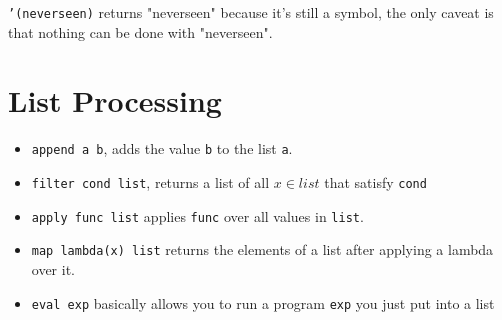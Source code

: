 \documentclass{scrartcl}
\begin{document}
\texttt{'(neverseen)} returns "neverseen" because it's still a symbol,
the only caveat is that nothing can be done with "neverseen".

\section{List Processing}
\begin{itemize}
	\item \texttt{append a b}, adds the value \texttt{b} to the list
		\texttt{a}.
	\item \texttt{filter cond list}, returns a list of all $x \in list$
		that satisfy \texttt{cond}
	\item \texttt{apply func list} applies \texttt{func} over all
		values in \texttt{list}.
	\item \texttt{map lambda(x) list} returns the elements of a list
		after applying a lambda over it.
	\item \texttt{eval exp} basically allows you to run 
		a program \texttt{exp} you just put into a list
\end{itemize}
\end{document}
